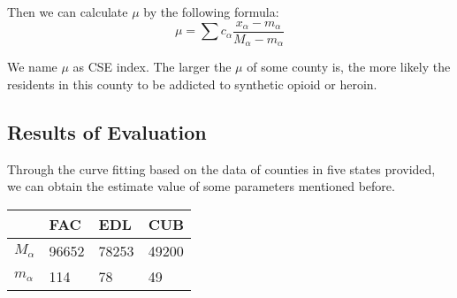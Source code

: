\documentclass{mcmthesis}
\begin{document}
Then we can calculate $\mu$ by the following formula:
\begin{equation} \mu = \sum c_{\alpha} \frac{x_{\alpha}-m_{\alpha}}{M_{\alpha}-m_{\alpha}} \end{equation}

We name $\mu$ as CSE index. The larger the $\mu$ of some county is, the more likely the residents in this county to be addicted to synthetic opioid or heroin.

\subsection{Results of Evaluation}

Through the curve fitting based on the data of counties in five states provided, we can obtain the estimate value of some parameters mentioned before.

\begin{table}[!h]
\centering
\begin{tabular}{l|lll}
\toprule
 & FAC& EDL & CUB\\
\midrule
  $M_{\alpha}$& 96652& 78253& 49200\\
  $m_{\alpha}$& 114& 78&49\\

\bottomrule
\end{tabular}
\end{table}
\end{document}
